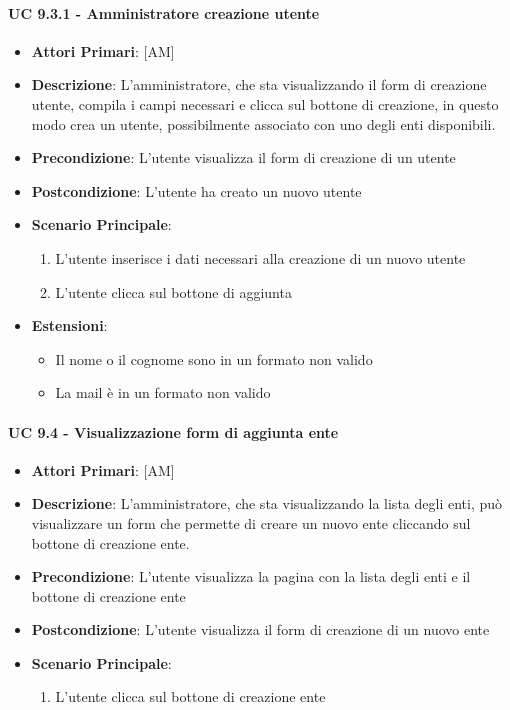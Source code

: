 			\paragraph{UC 9.3.1 - Amministratore creazione utente}
			\begin{itemize}
				\item \textbf{Attori Primari}: [AM]
				\item \textbf{Descrizione}: L'amministratore, che sta visualizzando il form di creazione utente, compila i campi necessari e clicca sul bottone di creazione, in questo modo crea un utente, possibilmente associato con uno degli enti disponibili.
				\item \textbf{Precondizione}: L'utente visualizza il form di creazione di un utente
				\item \textbf{Postcondizione}: L'utente ha creato un nuovo utente
				\item \textbf{Scenario Principale}:
				\begin{enumerate}
					\item{L'utente inserisce i dati necessari alla creazione di un nuovo utente}
					\item{L'utente clicca sul bottone di aggiunta}
				\end{enumerate}	
				\item \textbf{Estensioni}:
					\begin{itemize}
						\item Il nome o il cognome sono in un formato non valido
						\item La mail è in un formato non valido
					\end{itemize}
			\end{itemize}							

			\paragraph{UC 9.4 - Visualizzazione form di aggiunta ente }
			\begin{itemize}
				\item \textbf{Attori Primari}: [AM]
				\item \textbf{Descrizione}: L'amministratore, che sta visualizzando la lista degli enti, può visualizzare un form che permette di creare un nuovo ente cliccando sul bottone di creazione ente.
				\item \textbf{Precondizione}: L'utente visualizza la pagina con la lista degli enti e il bottone di creazione ente
				\item \textbf{Postcondizione}: L'utente visualizza il form di creazione di un nuovo ente
				\item \textbf{Scenario Principale}:
				\begin{enumerate}
					\item{L'utente clicca sul bottone di creazione ente}
				\end{enumerate}	
			\end{itemize}

